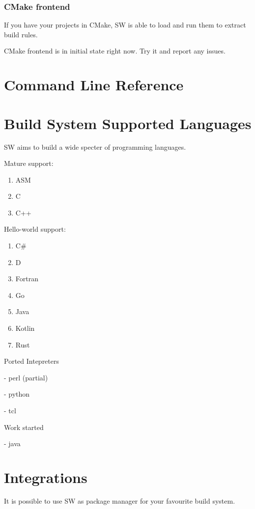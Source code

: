 \subsubsection{CMake frontend}

If you have your projects in CMake, SW is able to load and run them to extract build rules.

CMake frontend is in initial state right now. Try it and report any issues.




\section{Command Line Reference}




\section{Build System Supported Languages}

SW aims to build a wide specter of programming languages.

Mature support:
\begin{enumerate}
\item ASM
\item C
\item C++
\end{enumerate}

Hello-world support:
\begin{enumerate}
\item C\#
\item D
\item Fortran
\item Go
\item Java
\item Kotlin
\item Rust
\end{enumerate}


Ported Intepreters

- perl (partial)

- python

- tcl

Work started

- java


\section{Integrations}

It is possible to use SW as package manager for your favourite build system.


